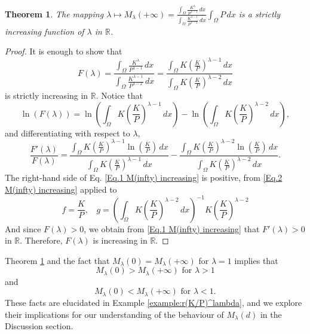 \documentclass[11pt]{article}
\newcommand{\R}{\mathbb{R}}
\newcommand{\parentheses}[1]{\left(#1\right)}
\newtheorem{theorem}[statement]{Theorem}
\theoremstyle{definition}
\theoremstyle{remark}
\begin{document}
\begin{theorem}\label{thm: M(infty) for r=(K/P)^beta}
    The mapping $\lambda\mapsto M_\lambda(+\infty)=\frac{\int_\Omega \frac{K^\lambda}{P^{\lambda-1}}\,dx}{\int_\Omega \frac{K^{\lambda-1}}{P^{\lambda-2}}\,dx}\int_\Omega P\,dx$ is a strictly increasing function of $\lambda$ in $\R$.
\end{theorem}
\begin{proof}
    It is enough to show that
    \begin{equation}\label{Eq.0 M(infty) increasing}
        F(\lambda)=\frac{\int_\Omega \frac{K^\lambda}{P^{\lambda-1}}\,dx}{\int_\Omega \frac{K^{\lambda-1}}{P^{\lambda-2}}\,dx}=\frac{\int_\Omega K\parentheses{\frac{K}{P}}^{\lambda-1}\,dx}{\int_\Omega K\parentheses{\frac{K}{P}}^{\lambda-2}\,dx}
    \end{equation}
    is strictly increasing in $\R$. Notice that
    \begin{equation*}
        \ln(F(\lambda))=\ln\parentheses{\int_\Omega K\parentheses{\frac{K}{P}}^{\lambda-1}\,dx}-\ln\parentheses{\int_\Omega K\parentheses{\frac{K}{P}}^{\lambda-2}\,dx},
    \end{equation*}
    and differentiating with respect to $\lambda$, 
    \begin{equation}\label{Eq.1 M(infty) increasing}
        \frac{F'(\lambda)}{F(\lambda)}=\frac{\int_\Omega K\parentheses{\frac{K}{P}}^{\lambda-1}\ln\parentheses{\frac{K}{P}}\,dx}{\int_\Omega K\parentheses{\frac{K}{P}}^{\lambda-1}\,dx}-\frac{\int_\Omega K\parentheses{\frac{K}{P}}^{\lambda-2}\ln\parentheses{\frac{K}{P}}\,dx}{\int_\Omega K\parentheses{\frac{K}{P}}^{\lambda-2}\,dx}.
    \end{equation}
    The right-hand side of Eq. \eqref{Eq.1 M(infty) increasing} is positive, from \eqref{Eq.2 M(infty) increasing} applied to 
    \begin{equation*}
       f=\frac{K}{P},~~~~g=\parentheses{\int_\Omega K\parentheses{\frac{K}{P}}^{\lambda-2}\,dx}^{-1}K\parentheses{\frac{K}{P}}^{\lambda-2} 
    \end{equation*}
     And since $F(\lambda)>0$, we obtain from \eqref{Eq.1 M(infty) increasing} that $F'(\lambda)>0$ in $\R$. Therefore, $F(\lambda)$ is increasing in $\R$.
\end{proof}

Theorem \ref{thm: M(infty) for r=(K/P)^beta} and the fact that  $M_\lambda(0)=M_\lambda(+\infty)$ for $\lambda=1$ implies that
\begin{equation*}
    M_\lambda(0)>M_\lambda(+\infty) \textrm{ for } \lambda>1
\end{equation*}
and 
\begin{equation*}
    M_\lambda(0)<M_\lambda(+\infty) \textrm{ for } \lambda<1.
\end{equation*}
These facts are elucidated in Example \ref{example:r(K/P)^lambda}, and we explore their implications for our understanding of the behaviour of $M_\lambda(d)$ in the Discussion section.
\end{document}
